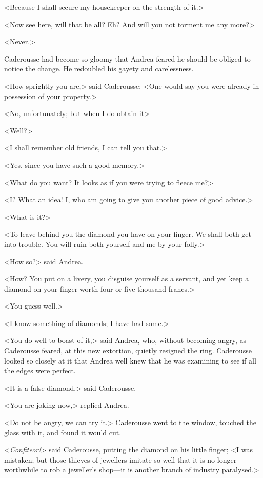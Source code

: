  <Because I shall secure my housekeeper on the strength of it.> 

 <Now see here, will that be all? Eh? And will you not torment me any more?> 

 <Never.> 

 Caderousse had become so gloomy that Andrea feared he should be obliged to notice the change. He redoubled his gayety and carelessness. 

 <How sprightly you are,> said Caderousse; <One would say you were already in possession of your property.> 

 <No, unfortunately; but when I do obtain it\longdash> 

 <Well?> 

 <I shall remember old friends, I can tell you that.> 

 <Yes, since you have such a good memory.> 

 <What do you want? It looks as if you were trying to fleece me?> 

 <I? What an idea! I, who am going to give you another piece of good advice.> 

 <What is it?> 

 <To leave behind you the diamond you have on your finger. We shall both get into trouble. You will ruin both yourself and me by your folly.> 

 <How so?> said Andrea. 

 <How? You put on a livery, you disguise yourself as a servant, and yet keep a diamond on your finger worth four or five thousand francs.> 

 <You guess well.> 

 <I know something of diamonds; I have had some.> 

 <You do well to boast of it,> said Andrea, who, without becoming angry, as Caderousse feared, at this new extortion, quietly resigned the ring. Caderousse looked so closely at it that Andrea well knew that he was examining to see if all the edges were perfect. 

 <It is a false diamond,> said Caderousse. 

 <You are joking now,> replied Andrea. 

 <Do not be angry, we can try it.> Caderousse went to the window, touched the glass with it, and found it would cut. 

 <\textit{Confiteor!}> said Caderousse, putting the diamond on his little finger; <I was mistaken; but those thieves of jewellers imitate so well that it is no longer worthwhile to rob a jeweller's shop—it is another branch of industry paralysed.> 

